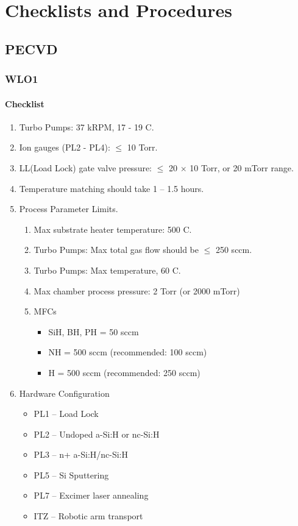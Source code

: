 \chapter{Checklists and Procedures}
\section{PECVD}
\subsection{WLO1}
\subsubsection{Checklist}
\begin{enumerate}
\item Turbo Pumps: 37 kRPM, 17 - 19 C.
\item Ion gauges (PL2 - PL4): $ \leq $ 10 Torr.
\item LL(Load Lock) gate valve pressure: $ \leq $ 20 $\times$ 10 Torr, or 20 mTorr range.
\item Temperature matching should take 1 -- 1.5 hours.
\item Process Parameter Limits.
  \begin{enumerate}
  \item Max substrate heater temperature: 500 	C.
  \item Turbo Pumps: Max total gas flow should be $\leq$ 250 sccm.
  \item Turbo Pumps: Max temperature, 60 C.
  \item Max chamber process pressure: 2 Torr (or 2000 mTorr)
  \item MFCs
    \begin{itemize}
    \item SiH, BH, %
      PH = 50 sccm
    \item NH =  500 sccm (recommended: 100 sccm)
    \item H = 500 sccm (recommended: 250 sccm)
    \end{itemize}
  \end{enumerate}
\item Hardware Configuration
  \begin{itemize}
  \item PL1 -- Load Lock
  \item PL2 -- Undoped a-Si:H or nc-Si:H
  \item PL3 -- n+ a-Si:H/nc-Si:H
  \item PL5 -- Si Sputtering
  \item PL7 -- Excimer laser annealing
  \item ITZ -- Robotic arm transport 
  \end{itemize}
\end{enumerate}

